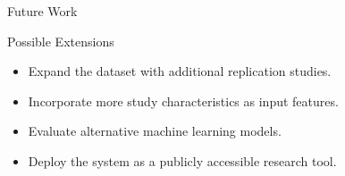 \begin{frame}{Future Work}
	
	\begin{block}{Possible Extensions}
		
		\begin{itemize}
			\item Expand the dataset with additional replication studies.
			\item Incorporate more study characteristics as input features.
			\item Evaluate alternative machine learning models.
			\item Deploy the system as a publicly accessible research tool.
		\end{itemize}
		
	\end{block}
	
\end{frame}
